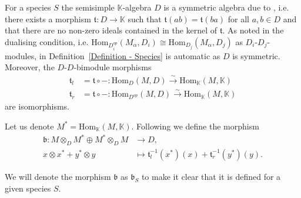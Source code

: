 \documentclass[a4paper, reqno]{amsart}
\theoremstyle{definition}
\newcommand{\K}{\mathbb{K}}
\renewcommand{\t}{\mathfrak{t}}
\renewcommand{\b}{\mathfrak{b}}
\begin{document}
For a species $S$ the semisimple $\K$-algebra $D$ is a symmetric algebra due to \cite[Corollary 5.17]{skowronski2011frobenius}, i.e. there exists a morphism $\t: D\to \K$ such that $\t(ab) = \t(ba)$ for all $a,b\in D$ and that there are no non-zero ideals contained in the kernel of $\t$. As noted in \cite[Remark 2.2]{Nquefack2012PotentialsJacobian} the dualising condition, i.e. $\mathrm{Hom}_{D_i^{op}}(M_\alpha, D_i)\cong \mathrm{Hom}_{D_j}(M_\alpha, D_j)$ as $D_i$-$D_j$-modules, in Definition~\ref{Definition - Species} is automatic as $D$ is symmetric. Moreover, the $D$-$D$-bimodule morphisms
\begin{equation*}
	\begin{aligned}
		\t_l &= \t\circ -: \mathrm{Hom}_D(M, D) \xrightarrow{\sim} \mathrm{Hom}_\K(M, \K) \\
		\t_r &= \t\circ -: \mathrm{Hom}_{D^{op}}(M, D) \xrightarrow{\sim} \mathrm{Hom}_\K(M, \K)
	\end{aligned}
\end{equation*}
are isomorphisms.

Let us denote $M^* = \mathrm{Hom}_\K(M, \K)$. Following \cite{Nquefack2012PotentialsJacobian} we define the morphism
\begin{equation*}
	\begin{aligned}
		\mathfrak{b}: M\otimes_D M^* \oplus M^*\otimes_D M &\to D, \\
		x\otimes x^* + y^*\otimes y &\mapsto \t_l^{-1}(x^*)(x) + \t_r^{-1}(y^*)(y).
	\end{aligned}
\end{equation*}

We will denote the morphism $\b$ as $\b_S$ to make it clear that it is defined for a given species $S$.
\end{document}
